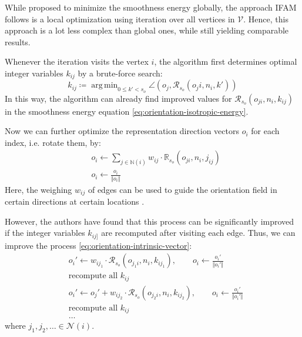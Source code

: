 \documentclass{ACGSeminar}
\DeclareMathOperator*{\argmin}{arg\,min}
\begin{document}
While \cite{bommes2009mixed} proposed to minimize the smoothness energy globally, the approach IFAM follows is a local optimization using iteration over all vertices in $\mathcal{V}$. Hence, this approach is a lot less complex than global ones, while still yielding comparable results.

Whenever the iteration visits the vertex $i$, the algorithm first determines optimal integer variables $k_{ij}$ by a brute-force search:
\begin{equation}\label{eq:orientation-intrinsic-integer}
	k_{ij} \coloneqq \argmin_{0 \leq k' < s_o} \angle(o_j, \mathcal{R}_{s_o}(o_ji, n_i, k'))
\end{equation}
In this way, the algorithm can already find improved values for $\mathcal{R}_{s_o}(o_{ji}, n_i, k_{ij})$ in the smoothness energy equation \eqref{eq:orientation-isotropic-energy}.

Now we can further optimize the representation direction vectors $o_i$ for each index, i.e. rotate them, by:
\begin{equation}\label{eq:orientation-intrinsic-vector}
\begin{split}
	& o_i \leftarrow \sum_{j \in \mathbb{N}(i)} w_{ij} \cdot \mathbb{R}_{s_o}(o_{ji}, n_i, j_{ij})\\
	& o_i \leftarrow \frac{o_i}{\Vert o_i \Vert}
\end{split}
\end{equation}
Here, the weighing $w_{ij}$ of edges can be used to guide the orientation field in certain directions at certain locations \cite{jakob2015instant}.\bigskip

However, the authors have found that this process can be significantly improved if the integer variables $k_{ij]}$ are recomputed after visiting each edge. Thus, we can improve the process \eqref{eq:orientation-intrinsic-vector}:
\begin{equation}
\begin{split}
	& o_i' \leftarrow w_{ij_1} \cdot \mathcal{R}_{s_o}(o_{j_1i}, n_i, k_{ij_1}), \qquad o_i \leftarrow \frac{o_i'}{\Vert o_i' \Vert}\\
	& \textrm{recompute all } k_{ij}\\
	& o_i' \leftarrow o_j' + w_{ij_2} \cdot \mathcal{R}_{s_o}(o_{j_2i}, n_i, k_{ij_2}), \qquad o_i \leftarrow \frac{o_i'}{\Vert o_i' \Vert}\\
	& \textrm{recompute all } k_{ij}\\
	& \dots
\end{split}
\end{equation}
where $j_1, j_2, \dots \in \mathcal{N}(i)$.
\end{document}
